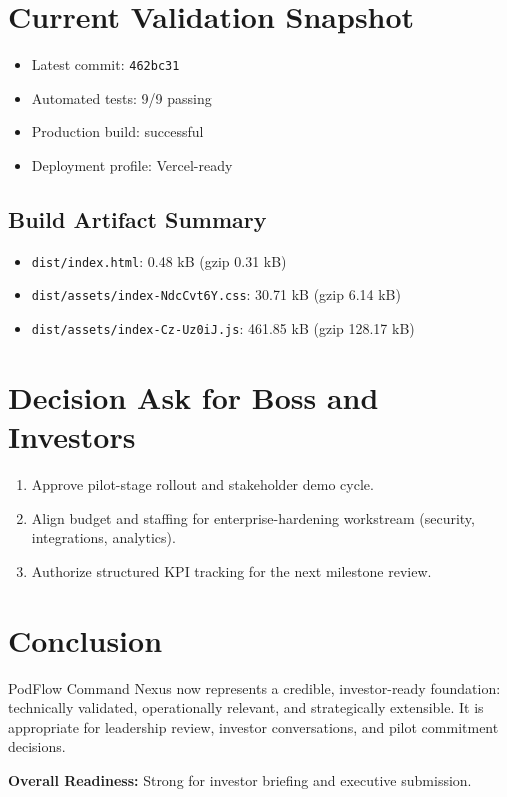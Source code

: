 \documentclass[11pt,a4paper]{article}
\begin{document}
\section{Current Validation Snapshot}
\begin{itemize}
  \item Latest commit: \texttt{462bc31}
  \item Automated tests: 9/9 passing
  \item Production build: successful
  \item Deployment profile: Vercel-ready
\end{itemize}

\subsection*{Build Artifact Summary}
\begin{itemize}
  \item \texttt{dist/index.html}: 0.48 kB (gzip 0.31 kB)
  \item \texttt{dist/assets/index-NdcCvt6Y.css}: 30.71 kB (gzip 6.14 kB)
  \item \texttt{dist/assets/index-Cz-Uz0iJ.js}: 461.85 kB (gzip 128.17 kB)
\end{itemize}

\section{Decision Ask for Boss and Investors}
\begin{enumerate}
  \item Approve pilot-stage rollout and stakeholder demo cycle.
  \item Align budget and staffing for enterprise-hardening workstream (security, integrations, analytics).
  \item Authorize structured KPI tracking for the next milestone review.
\end{enumerate}

\section*{Conclusion}
PodFlow Command Nexus now represents a credible, investor-ready foundation: technically validated, operationally relevant, and strategically extensible. It is appropriate for leadership review, investor conversations, and pilot commitment decisions.

\vspace{1em}
\noindent\textbf{Overall Readiness:} \textcolor{green!50!black}{Strong for investor briefing and executive submission.}
\end{document}
